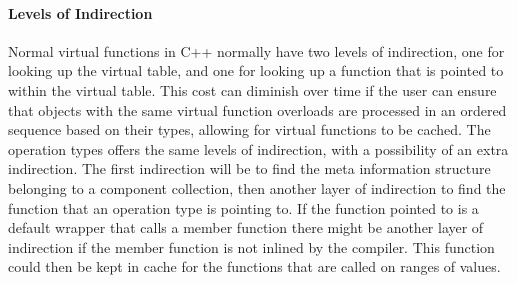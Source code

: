 \paragraph{Levels of Indirection}
Normal virtual functions in C++ normally have two levels of indirection, one for looking up the virtual table, and one for looking up a function that is pointed to within the virtual table.
This cost can diminish over time if the user can ensure that objects with the same virtual function overloads are processed in an ordered sequence based on their types, allowing for virtual functions to be cached.
The operation types offers the same levels of indirection, with a possibility of an extra indirection.
The first indirection will be to find the meta information structure belonging to a component collection, then another layer of indirection to find the function that an operation type is pointing to.
If the function pointed to is a default wrapper that calls a member function there might be another layer of indirection if the member function is not inlined by the compiler.
This function could then be kept in cache for the functions that are called on ranges of values.